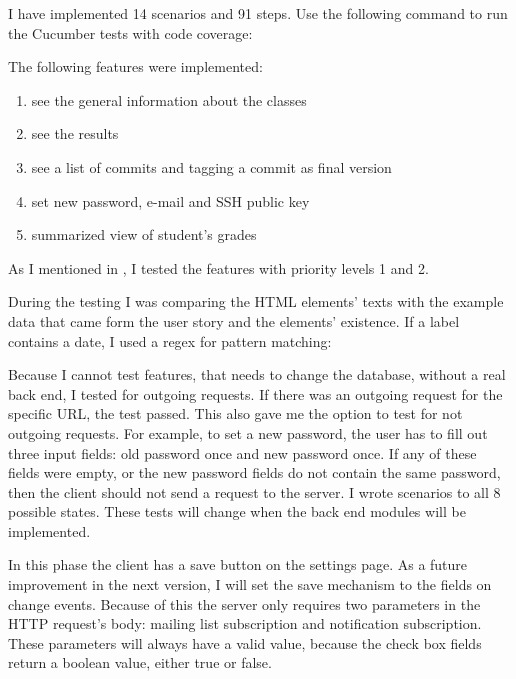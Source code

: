 I have implemented 14 scenarios and 91 steps. Use the following command to run the Cucumber tests with code coverage:


The following features were implemented:

\begin{enumerate}
	\item see the general information about the classes
	\setcounter{enumi}{0}
	\item see the results
	\item see a list of commits and tagging a commit as final version
	\setcounter{enumi}{1}
	\item set new password, e-mail and SSH public key
	\item summarized view of student's grades
\end{enumerate}

As I mentioned in , I tested the features with priority levels 1 and 2.

During the testing I was comparing the HTML elements' texts with the example data that came form the user story and the elements' existence. If a label contains a date, I used a regex for pattern matching:


Because I cannot test features, that needs to change the database, without a real back end, I tested for outgoing requests. If there was an outgoing request for the specific URL, the test passed. This  also gave me the option to test for not outgoing requests. For example, to set a new password, the user has to fill out three input fields: old password once and new password once. If any of these fields were empty, or the new password fields do not contain the same password, then the client should not send a request to the server. I wrote scenarios to all 8 possible states. These tests will change when the back end modules will be implemented.

In this phase the client has a save button on the settings page. As a future improvement in the next version, I will set the save mechanism to the fields on change events. Because of this the server only requires two parameters in the HTTP request's body: mailing list subscription and notification subscription. These parameters will always have a valid value, because the check box fields return a boolean value, either true or false.


